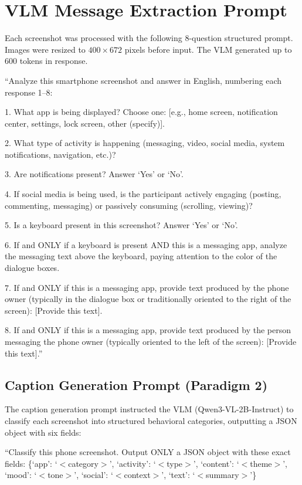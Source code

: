 \documentclass[review,12pt,authoryear]{elsarticle}
\begin{document}
\appendix

\section{VLM Message Extraction Prompt}\label{app:vlm_prompts}

Each screenshot was processed with the following 8-question structured prompt. Images were resized to $400 \times 672$ pixels before input. The VLM generated up to 600 tokens in response.

``Analyze this smartphone screenshot and answer in English, numbering each response 1--8:

1. What app is being displayed? Choose one: [e.g., home screen, notification center, settings, lock screen, other (specify)].

2. What type of activity is happening (messaging, video, social media, system notifications, navigation, etc.)?

3. Are notifications present? Answer `Yes' or `No'.

4. If social media is being used, is the participant actively engaging (posting, commenting, messaging) or passively consuming (scrolling, viewing)?

5. Is a keyboard present in this screenshot? Answer `Yes' or `No'.

6. If and ONLY if a keyboard is present AND this is a messaging app, analyze the messaging text above the keyboard, paying attention to the color of the dialogue boxes.

7. If and ONLY if this is a messaging app, provide text produced by the phone owner (typically in the dialogue box or traditionally oriented to the right of the screen): [Provide this text].

8. If and ONLY if this is a messaging app, provide text produced by the person messaging the phone owner (typically oriented to the left of the screen): [Provide this text].''

\subsection{Caption Generation Prompt (Paradigm 2)}\label{app:caption_prompt}

The caption generation prompt instructed the VLM (Qwen3-VL-2B-Instruct) to classify each screenshot into structured behavioral categories, outputting a JSON object with six fields:

``Classify this phone screenshot. Output ONLY a JSON object with these exact fields: \{`app': `$<$category$>$', `activity': `$<$type$>$', `content': `$<$theme$>$', `mood': `$<$tone$>$', `social': `$<$context$>$', `text': `$<$summary$>$'\}
\end{document}
